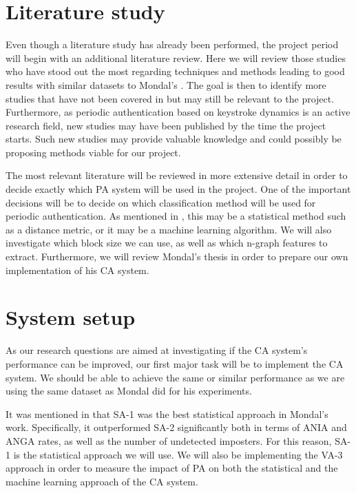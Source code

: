 \documentclass[informationsecurity]{gucmasterproject}
\begin{document}
\section{Literature study}
Even though a literature study has already been performed, the project period will begin with an additional literature review.
Here we will review those studies who have stood out the most regarding techniques and methods leading to good results with similar datasets to Mondal's \cite{mondal}.
The goal is then to identify more studies that have not been covered in  but may still be relevant to the project.
Furthermore, as periodic authentication based on keystroke dynamics is an active research field, new studies may have been published by the time the project starts.
Such new studies may provide valuable knowledge and could possibly be proposing methods viable for our project.

The most relevant literature will be reviewed in more extensive detail in order to decide exactly which PA system will be used in the project.
One of the important decisions will be to decide on which classification method will be used for periodic authentication.
As mentioned in , this may be a statistical method such as a distance metric, or it may be a machine learning algorithm.
We will also investigate which block size we can use, as well as which n-graph features to extract.
Furthermore, we will review Mondal's \cite{mondal} thesis in order to prepare our own implementation of his CA system.

\section{System setup}
\label{sec:systemsetup}
As our research questions are aimed at investigating if the CA system's performance can be improved, our first major task will be to implement the CA system.
We should be able to achieve the same or similar performance as we are using the same dataset as Mondal \cite{mondal} did for his experiments.

It was mentioned in  that SA-1 was the best statistical approach in Mondal's work.
Specifically, it outperformed SA-2 significantly both in terms of ANIA and ANGA rates, as well as the number of undetected imposters.
For this reason, SA-1 is the statistical approach we will use.
We will also be implementing the VA-3 approach in order to measure the impact of PA on both the statistical and the machine learning approach of the CA system.
\end{document}

